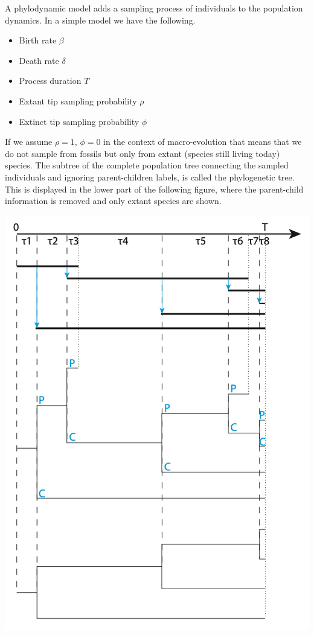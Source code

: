 \documentclass{article}
\begin{document}
\begin{multicols*}{3}
A phylodynamic model adds a sampling process of individuals to the population dynamics. In a simple model we have the following. 

\begin{itemize}
    \item Birth rate $\beta$
    \item Death rate $\delta$
    \item Process duration $T$
    \item Extant tip sampling probability $\rho$
    \item Extinct tip sampling probability $\phi$
\end{itemize}


If we assume $\rho = 1$, $\phi = 0$ in the context of macro-evolution that means that we do not sample from fossils but only from extant (species still living today) species. The subtree of the complete population tree connecting the sampled individuals and ignoring parent-children labels, is called the phylogenetic tree. This is displayed in the lower part of the following figure, where the parent-child information is removed and only extant species are shown. %


\begin{center}
    \includegraphics[width=0.8\linewidth, angle=0.0]{extanttree.png}
\end{center}


\end{multicols*}
\end{document}
